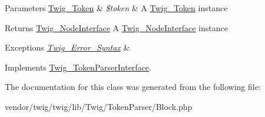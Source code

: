 \begin{DoxyParams}[1]{Parameters}
\hyperlink{classTwig__Token}{Twig\+\_\+\+Token} & {\em \$token} & A \hyperlink{classTwig__Token}{Twig\+\_\+\+Token} instance\\
\hline
\end{DoxyParams}
\begin{DoxyReturn}{Returns}
\hyperlink{interfaceTwig__NodeInterface}{Twig\+\_\+\+Node\+Interface} A \hyperlink{interfaceTwig__NodeInterface}{Twig\+\_\+\+Node\+Interface} instance
\end{DoxyReturn}

\begin{DoxyExceptions}{Exceptions}
{\em \hyperlink{classTwig__Error__Syntax}{Twig\+\_\+\+Error\+\_\+\+Syntax}} & \\
\hline
\end{DoxyExceptions}


Implements \hyperlink{interfaceTwig__TokenParserInterface_a9d003ebcca4a13c6f36b86e79815e823}{Twig\+\_\+\+Token\+Parser\+Interface}.



The documentation for this class was generated from the following file\+:\begin{DoxyCompactItemize}
\item 
vendor/twig/twig/lib/\+Twig/\+Token\+Parser/Block.\+php\end{DoxyCompactItemize}
